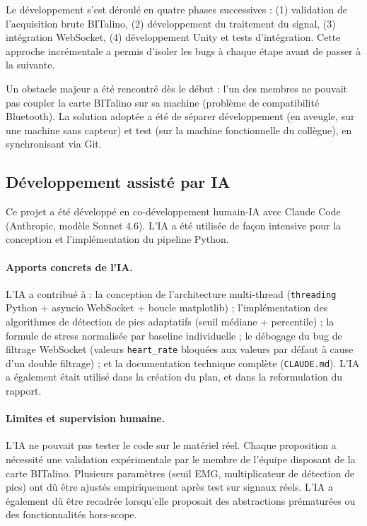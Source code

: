 \documentclass[runningheads]{llncs}
\begin{document}
Le développement s'est déroulé en quatre phases successives :
(1) validation de l'acquisition brute BITalino, (2) développement du
traitement du signal, (3) intégration WebSocket, (4) développement Unity
et tests d'intégration. Cette approche incrémentale a permis d'isoler
les bugs à chaque étape avant de passer à la suivante.

Un obstacle majeur a été rencontré dès le début : l'un des membres ne
pouvait pas coupler la carte BITalino sur sa machine (problème de
compatibilité Bluetooth). La solution adoptée a été de séparer
développement (en aveugle, sur une machine sans capteur) et test
(sur la machine fonctionnelle du collègue), en synchronisant via Git.

\subsection{Développement assisté par IA}

Ce projet a été développé en co-développement humain-IA avec Claude Code
(Anthropic, modèle Sonnet 4.6). L'IA a été utilisée de façon intensive
pour la conception et l'implémentation du pipeline Python.

\paragraph{Apports concrets de l'IA.}
L'IA a contribué à : la conception de l'architecture multi-thread
(\texttt{threading} Python + asyncio WebSocket + boucle matplotlib) ;
l'implémentation des algorithmes de détection de pics adaptatifs (seuil
médiane + percentile) ; la formule de stress normalisée par baseline
individuelle ; le débogage du bug de filtrage WebSocket (valeurs
\texttt{heart\_rate} bloquées aux valeurs par défaut à cause d'un double
filtrage) ; et la documentation technique complète (\texttt{CLAUDE.md}). L'IA a également était utilisé dans la création du plan, et dans la reformulation du rapport.

\paragraph{Limites et supervision humaine.}
L'IA ne pouvait pas tester le code sur le matériel réel. Chaque proposition
a nécessité une validation expérimentale par le membre de l'équipe disposant
de la carte BITalino. Plusieurs paramètres (seuil EMG, multiplicateur de
détection de pics) ont dû être ajustés empiriquement après test sur signaux
réels. L'IA a également dû être recadrée lorsqu'elle proposait des
abstractions prématurées ou des fonctionnalités hors-scope.
\end{document}

